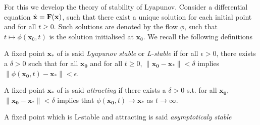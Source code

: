 For this we develop the theory of stability of Lyapunov. Consider a differential equation $\dot{\mathbf{x}}=\mathbf{F}(\mathbf{x})$, such that there exist a unique solution for each initial point and for all $t\geq0$. Such solutions are denoted by the flow $\phi$, such that $t\mapsto \phi(\mathbf{x}_0,t)$ is the solution initialised at $\mathbf{x}_0$. We recall the following definitions

\begin{definition}
 A fixed point $\mathbf{x}_*$ of  is said \emph{Lyapunov stable} or \emph{L-stable} if 
 for all $\epsilon>0$, there exists a $\delta>0$ such that for all $\mathbf{x_0}$ and for all $t\geq0$, $\|\mathbf{x_0} - \mathbf{x}_*\| < \delta$ implies $\|\phi(\mathbf{x_0},t) - \mathbf{x}_*\| < \epsilon$.
\end{definition}

\begin{definition}
A fixed point $\mathbf{x}_*$ of  is said \emph{attracting} if there exists a $\delta>0$ s.t. for all $\mathbf{x_0}$, $\|\mathbf{x_0} - \mathbf{x}_*\| < \delta$ implies that $\phi(\mathbf{x_0},t) \to \mathbf{x}_*$ as $t \to\infty$.
\end{definition}

\begin{definition}
    A fixed point which is L-stable and attracting is said \emph{asymptoticaly stable}
\end{definition}

